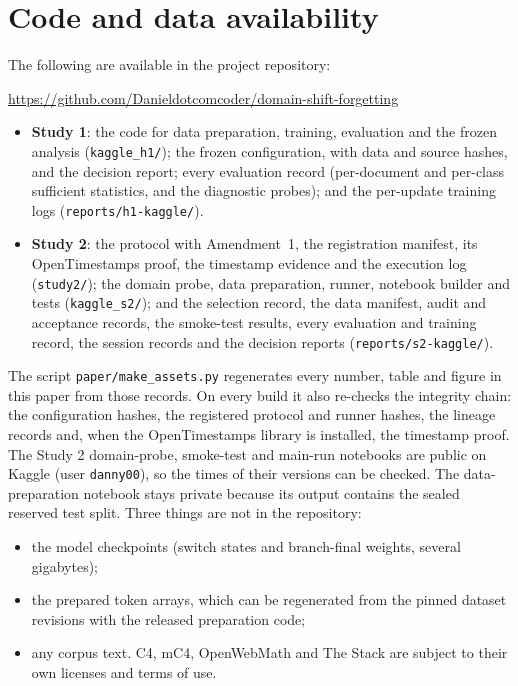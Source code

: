 \documentclass[11pt]{article}
\begin{document}
\section*{Code and data availability}
The following are available in the project repository:
\begin{center}\url{https://github.com/Danieldotcomcoder/domain-shift-forgetting}\end{center}
\begin{itemize}[leftmargin=1.4em,itemsep=1pt]
  \item \textbf{Study 1}: the code for data preparation, training, evaluation and the frozen analysis
        (\texttt{kaggle\_h1/}); the frozen configuration, with data and source hashes, and the decision report;
        every evaluation record (per-document and per-class sufficient statistics, and the diagnostic probes);
        and the per-update training logs (\texttt{reports/h1-kaggle/}).
  \item \textbf{Study 2}: the protocol with Amendment~1, the registration manifest, its OpenTimestamps proof, the
        timestamp evidence and the execution log (\texttt{study2/}); the domain probe, data preparation, runner,
        notebook builder and tests (\texttt{kaggle\_s2/}); and the selection record, the data manifest, audit and
        acceptance records, the smoke-test results, every evaluation and training record, the session records and
        the decision reports (\texttt{reports/s2-kaggle/}).
\end{itemize}
The script \texttt{paper/make\_assets.py} regenerates every number, table and figure in this paper from those
records. On every build it also re-checks the integrity chain: the configuration hashes, the registered protocol
and runner hashes, the lineage records and, when the OpenTimestamps library is installed, the timestamp proof. The Study 2 domain-probe, smoke-test and main-run
notebooks are public on Kaggle (user \texttt{danny00}), so the times of their versions can be checked. The
data-preparation notebook stays private because its output contains the sealed reserved test split. Three things
are not in the repository:
\begin{itemize}[leftmargin=1.4em,itemsep=1pt]
  \item the model checkpoints (switch states and branch-final weights, several gigabytes);
  \item the prepared token arrays, which can be regenerated from the pinned dataset revisions with the released
        preparation code;
  \item any corpus text. C4, mC4, OpenWebMath and The Stack are subject to their own licenses and terms of use.
\end{itemize}
\end{document}
